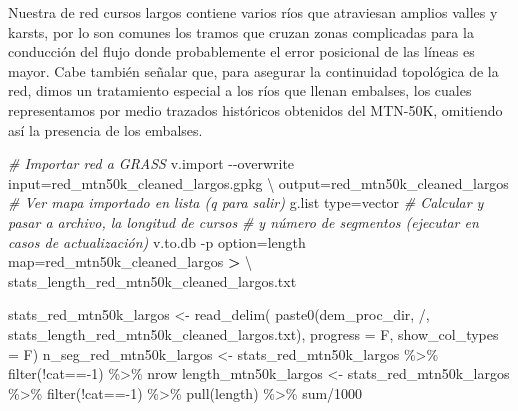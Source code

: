\documentclass[spanish]{article}
\newenvironment{Shaded}{\begin{snugshade}}{\end{snugshade}}
\newcommand{\AttributeTok}[1]{\textcolor[rgb]{0.77,0.63,0.00}{#1}}
\newcommand{\CommentTok}[1]{\textcolor[rgb]{0.56,0.35,0.01}{\textit{#1}}}
\newcommand{\DataTypeTok}[1]{\textcolor[rgb]{0.13,0.29,0.53}{#1}}
\newcommand{\DecValTok}[1]{\textcolor[rgb]{0.00,0.00,0.81}{#1}}
\newcommand{\ExtensionTok}[1]{#1}
\newcommand{\FunctionTok}[1]{\textcolor[rgb]{0.00,0.00,0.00}{#1}}
\newcommand{\NormalTok}[1]{#1}
\newcommand{\OperatorTok}[1]{\textcolor[rgb]{0.81,0.36,0.00}{\textbf{#1}}}
\newcommand{\OtherTok}[1]{\textcolor[rgb]{0.56,0.35,0.01}{#1}}
\newcommand{\SpecialCharTok}[1]{\textcolor[rgb]{0.00,0.00,0.00}{#1}}
\newcommand{\StringTok}[1]{\textcolor[rgb]{0.31,0.60,0.02}{#1}}
\begin{document}
Nuestra de red cursos largos contiene varios ríos que atraviesan amplios
valles y karsts, por lo son comunes los tramos que cruzan zonas
complicadas para la conducción del flujo donde probablemente el error
posicional de las líneas es mayor. Cabe también señalar que, para
asegurar la continuidad topológica de la red, dimos un tratamiento
especial a los ríos que llenan embalses, los cuales representamos por
medio trazados históricos obtenidos del MTN-50K, omitiendo así la
presencia de los embalses.

\begin{Shaded}
\begin{Highlighting}[]
\CommentTok{\# Importar red a GRASS}
\ExtensionTok{v.import} \AttributeTok{{-}{-}overwrite}\NormalTok{ input=red\_mtn50k\_cleaned\_largos.gpkg }\DataTypeTok{\textbackslash{}}
\NormalTok{  output=red\_mtn50k\_cleaned\_largos}
\CommentTok{\# Ver mapa importado en lista (q para salir)}
\ExtensionTok{g.list}\NormalTok{ type=vector}
\CommentTok{\# Calcular y pasar a archivo, la longitud de cursos}
\CommentTok{\# y número de segmentos (ejecutar en casos de actualización)}
\ExtensionTok{v.to.db} \AttributeTok{{-}p}\NormalTok{ option=length map=red\_mtn50k\_cleaned\_largos }\OperatorTok{\textgreater{}} \DataTypeTok{\textbackslash{} }
  \ExtensionTok{stats\_length\_red\_mtn50k\_cleaned\_largos.txt}
\end{Highlighting}
\end{Shaded}

\begin{Shaded}
\begin{Highlighting}[]
\NormalTok{stats\_red\_mtn50k\_largos }\OtherTok{\textless{}{-}} \FunctionTok{read\_delim}\NormalTok{(}
  \FunctionTok{paste0}\NormalTok{(dem\_proc\_dir, }\StringTok{\textquotesingle{}/\textquotesingle{}}\NormalTok{,}
         \StringTok{\textquotesingle{}stats\_length\_red\_mtn50k\_cleaned\_largos.txt\textquotesingle{}}\NormalTok{),}
  \AttributeTok{progress =}\NormalTok{ F, }\AttributeTok{show\_col\_types =}\NormalTok{ F)}
\NormalTok{n\_seg\_red\_mtn50k\_largos }\OtherTok{\textless{}{-}}\NormalTok{ stats\_red\_mtn50k\_largos }\SpecialCharTok{\%\textgreater{}\%}
  \FunctionTok{filter}\NormalTok{(}\SpecialCharTok{!}\NormalTok{cat}\SpecialCharTok{=={-}}\DecValTok{1}\NormalTok{) }\SpecialCharTok{\%\textgreater{}\%}\NormalTok{ nrow}
\NormalTok{length\_mtn50k\_largos }\OtherTok{\textless{}{-}}\NormalTok{ stats\_red\_mtn50k\_largos }\SpecialCharTok{\%\textgreater{}\%}
  \FunctionTok{filter}\NormalTok{(}\SpecialCharTok{!}\NormalTok{cat}\SpecialCharTok{=={-}}\DecValTok{1}\NormalTok{) }\SpecialCharTok{\%\textgreater{}\%} \FunctionTok{pull}\NormalTok{(length) }\SpecialCharTok{\%\textgreater{}\%}\NormalTok{ sum}\SpecialCharTok{/}\DecValTok{1000}
\end{Highlighting}
\end{Shaded}
\end{document}

